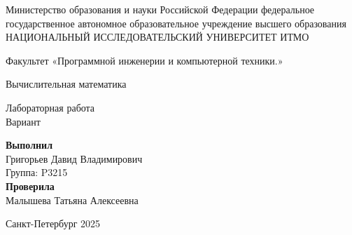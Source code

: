 
\begin{center}
	Министерство образования и науки Российской Федерации
	федеральное государственное автономное образовательное учреждение высшего образования
	\\
     {НАЦИОНАЛЬНЫЙ ИССЛЕДОВАТЕЛЬСКИЙ УНИВЕРСИТЕТ ИТМО}

    \vspace{2em}
    Факультет «Программной инженерии и компьютерной техники.»

    \vspace{10em}

    {\large Вычислительная математика }\\

    \vspace{2em}

    {\large Лабораторная работа }\\
    {\large Вариант }

\end{center}


\vspace{20em}

\begin{flushright}
    \textbf{Выполнил} \\
    Григорьев Давид Владимирович\\

    Группа: P3215\\
    \textbf{Проверила}\\
    Малышева Татьяна Алексеевна

\end{flushright}

\vspace{\fill}

\begin{center}
   Санкт-Петербург 2025
\end{center}
